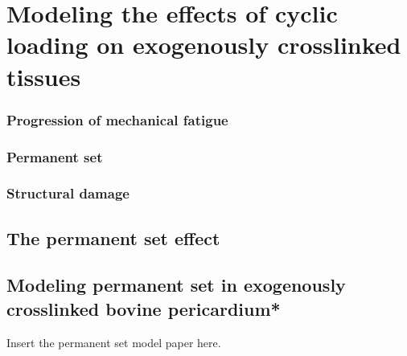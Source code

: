\chapter{Modeling the effects of cyclic loading on exogenously crosslinked tissues}

\subsection{Progression of mechanical fatigue}
\subsection{Permanent set}
\subsection{Structural damage}

\section{The permanent set effect}

\section{Modeling permanent set in exogenously crosslinked bovine pericardium*}

Insert the permanent set model paper here.
